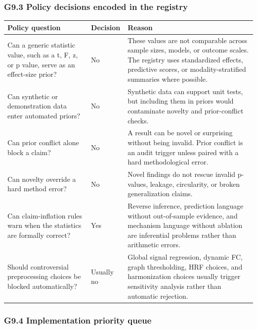 \subsubsection{\texorpdfstring{\textbf{G9.3 Policy decisions encoded in the registry}}{G9.3 Policy decisions encoded in the registry}}

\begin{longtable}{|>{\RaggedRight\hspace{0pt}\arraybackslash}p{}|>{\RaggedRight\hspace{0pt}\arraybackslash}p{}|>{\RaggedRight\hspace{0pt}\arraybackslash}p{}|}
\hline
\rowcolor{brtablehead}\textbf{Policy question} & \textbf{Decision} & \textbf{Reason} \\
\hline
Can a generic statistic value, such as a t, F, z, or p value, serve as an effect-size prior? & No & These values are not comparable across sample sizes, models, or outcome scales. The registry uses standardized effects, predictive scores, or modality-stratified summaries where possible. \\
\hline
Can synthetic or demonstration data enter automated priors? & No & Synthetic data can support unit tests, but including them in priors would contaminate novelty and prior-conflict checks. \\
\hline
Can prior conflict alone block a claim? & No & A result can be novel or surprising without being invalid. Prior conflict is an audit trigger unless paired with a hard methodological error. \\
\hline
Can novelty override a hard method error? & No & Novel findings do not rescue invalid p-values, leakage, circularity, or broken generalization claims. \\
\hline
Can claim-inflation rules warn when the statistics are formally correct? & Yes & Reverse inference, prediction language without out-of-sample evidence, and mechanism language without ablation are inferential problems rather than arithmetic errors. \\
\hline
Should controversial preprocessing choices be blocked automatically? & Usually no & Global signal regression, dynamic FC, graph thresholding, HRF choices, and harmonization choices usually trigger sensitivity analysis rather than automatic rejection. \\
\hline
\end{longtable}

\subsubsection{\texorpdfstring{\textbf{G9.4 Implementation priority queue}}{G9.4 Implementation priority queue}}


